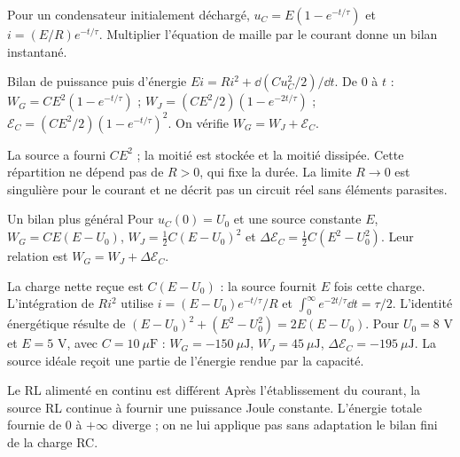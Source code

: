 Pour un condensateur initialement déchargé, $u_C=E(1-e^{-t/\tau})$ et $i=(E/R)e^{-t/\tau}$. Multiplier l’équation de maille par le courant donne un bilan instantané.
\begin{loi}{Bilan de puissance puis d’énergie}
$Ei=Ri^2+\dd(Cu_C^2/2)/\dd t$. De $0$ à $t$ : $W_G=CE^2(1-e^{-t/\tau})$ ; $W_J=(CE^2/2)(1-e^{-2t/\tau})$ ; $\mathcal E_C=(CE^2/2)(1-e^{-t/\tau})^2$. On vérifie $W_G=W_J+\mathcal E_C$.
\end{loi}
La source a fourni $CE^2$ ; la moitié est stockée et la moitié dissipée. Cette répartition ne dépend pas de $R>0$, qui fixe la durée. La limite $R\to0$ est singulière pour le courant et ne décrit pas un circuit réel sans éléments parasites.


\begin{loi}{Un bilan plus général}
Pour $u_C(0)=U_0$ et une source constante $E$, $W_G=CE(E-U_0)$, $W_J=\tfrac12C(E-U_0)^2$ et $\Delta\mathcal E_C=\tfrac12C(E^2-U_0^2)$. Leur relation est $W_G=W_J+\Delta\mathcal E_C$.
\end{loi}
La charge nette reçue est $C(E-U_0)$ : la source fournit $E$ fois cette charge. L’intégration de $Ri^2$ utilise $i=(E-U_0)e^{-t/\tau}/R$ et $\int_0^\infty e^{-2t/\tau}\dd t=\tau/2$. L’identité énergétique résulte de $(E-U_0)^2+(E^2-U_0^2)=2E(E-U_0)$.
Pour $U_0=8$ V et $E=5$ V, avec $C=10\ \mu\mathrm{ F}$ : $W_G=-150\ \mu\mathrm{ J}$, $W_J=45\ \mu\mathrm{ J}$, $\Delta\mathcal E_C=-195\ \mu\mathrm{ J}$. La source idéale reçoit une partie de l’énergie rendue par la capacité.
\begin{piege}{Le RL alimenté en continu est différent}
Après l’établissement du courant, la source RL continue à fournir une puissance Joule constante. L’énergie totale fournie de $0$ à $+\infty$ diverge ; on ne lui applique pas sans adaptation le bilan fini de la charge RC.
\end{piege}


